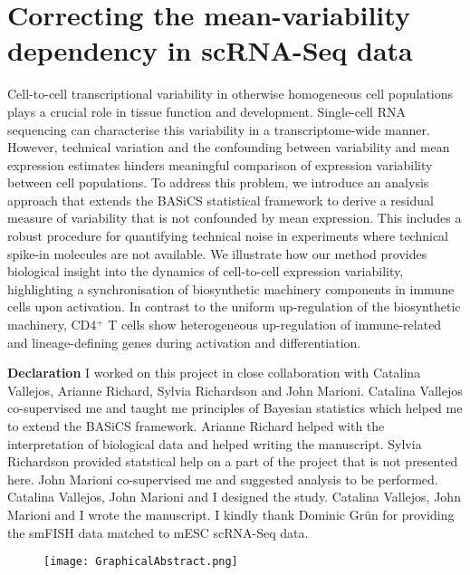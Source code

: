 
\chapter{Correcting the mean-variability dependency in scRNA-Seq data}  

\graphicspath{{Chapter2/Figures/}}

\begin{Abstract}
Cell-to-cell transcriptional variability in otherwise homogeneous cell populations plays a crucial role in tissue function and development. Single-cell RNA sequencing can characterise this variability in a transcriptome-wide manner. However, technical variation and the confounding between variability and mean expression estimates hinders meaningful comparison of expression variability between cell populations. To address this problem, we introduce an analysis approach that extends the BASiCS statistical framework to derive a residual measure of variability that is not confounded by mean expression. This includes a robust procedure for quantifying technical noise in experiments where technical spike-in molecules are not available.
We illustrate how our method provides biological insight into the dynamics of cell-to-cell expression variability, highlighting a synchronisation of biosynthetic machinery components in immune cells upon activation. In contrast to the uniform up-regulation of the biosynthetic machinery, CD4$^+$ T cells show heterogeneous up-regulation of immune-related and lineage-defining genes during activation and differentiation. 
\end{Abstract}

\newpage

\begin{Comment}
\textbf{Declaration} I worked on this project in close collaboration with Catalina Vallejos, Arianne Richard, Sylvia Richardson and John Marioni. Catalina Vallejos co-supervised me and taught me principles of Bayesian statistics which helped me to extend the BASiCS framework. Arianne Richard helped with the interpretation of biological data and helped writing the manuscript. Sylvia Richardson provided statstical help on a part of the project that is not presented here. John Marioni co-supervised me and suggested analysis to be performed. Catalina Vallejos, John Marioni and I designed the study. Catalina Vallejos, John Marioni and I wrote the manuscript. I kindly thank Dominic Gr\"un for providing the smFISH data matched to mESC scRNA-Seq data. 
\end{Comment}

\begin{figure}[hb]
\centering    
\texttt{[image: GraphicalAbstract.png]}
\caption*{}
\end{figure}


\newpage


\newpage


